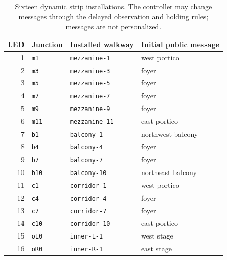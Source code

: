 \begin{table}[htbp]\centering\small

\begin{tabular}{rlll}\toprule

LED & Junction & Installed walkway & Initial public message\\\midrule

1 & \texttt{m1} & \texttt{mezzanine-1} & west portico\\

2 & \texttt{m3} & \texttt{mezzanine-3} & foyer\\

3 & \texttt{m5} & \texttt{mezzanine-5} & foyer\\

4 & \texttt{m7} & \texttt{mezzanine-7} & foyer\\

5 & \texttt{m9} & \texttt{mezzanine-9} & foyer\\

6 & \texttt{m11} & \texttt{mezzanine-11} & east portico\\

7 & \texttt{b1} & \texttt{balcony-1} & northwest balcony\\

8 & \texttt{b4} & \texttt{balcony-4} & foyer\\

9 & \texttt{b7} & \texttt{balcony-7} & foyer\\

10 & \texttt{b10} & \texttt{balcony-10} & northeast balcony\\

11 & \texttt{c1} & \texttt{corridor-1} & west portico\\

12 & \texttt{c4} & \texttt{corridor-4} & foyer\\

13 & \texttt{c7} & \texttt{corridor-7} & foyer\\

14 & \texttt{c10} & \texttt{corridor-10} & east portico\\

15 & \texttt{oL0} & \texttt{inner-L-1} & west stage\\

16 & \texttt{oR0} & \texttt{inner-R-1} & east stage\\

\bottomrule\end{tabular}\caption{Sixteen dynamic strip installations. The controller may change messages through the delayed observation and holding rules; messages are not personalized.}\end{table}

